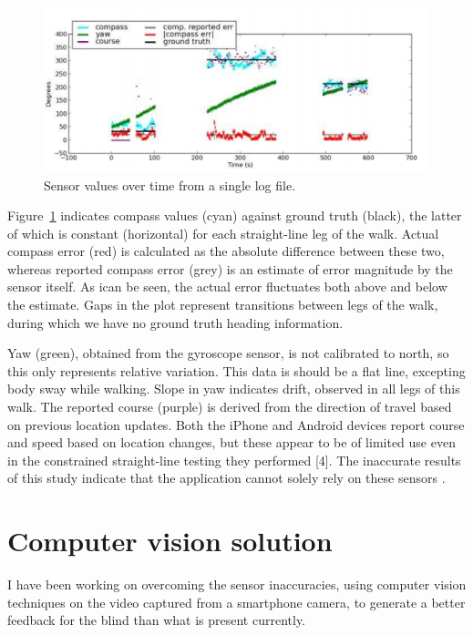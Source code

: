 \begin{figure}
\begin{center}
\includegraphics[scale=0.8]{sensor.png}
\caption{Sensor values over time from a single log file.}
\label{fig:sensors}
\end{center}
\end{figure}


Figure~\ref{fig:sensors} indicates compass values (cyan) against ground truth (black), the latter of which is constant (horizontal) for each straight-line leg of the walk. Actual compass error (red) is calculated as the absolute difference between these two, whereas reported compass error (grey) is an estimate of error magnitude by the sensor itself. As ican be seen, the actual error fluctuates both above and below the estimate. Gaps in the plot represent transitions between legs of the walk, during which we have no ground truth heading information.

Yaw (green), obtained from the gyroscope sensor, is not calibrated to north, so this only represents relative variation. This data is should be a flat line, excepting body sway while walking. Slope in yaw indicates drift, observed in all legs of this walk. The reported course (purple) is derived from the direction of travel based on previous location updates. Both the iPhone and Android devices report course and speed based on location changes, but these appear to be of limited use even in the constrained straight-line testing they performed [4]. The inaccurate results of this study indicate that the application cannot solely rely on these sensors \cite{BlumSensors}.

\section{Computer vision solution}
I have been working on overcoming the sensor inaccuracies, using computer vision techniques on the video captured from a smartphone camera, to generate a better feedback for the blind than what is present currently.

